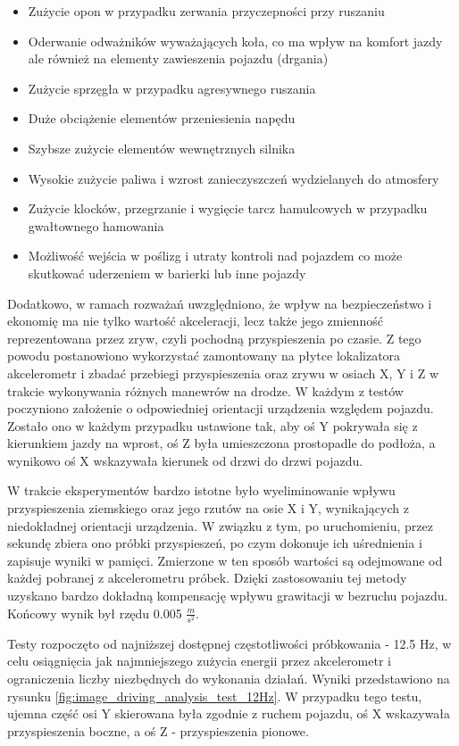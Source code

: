 \begin{itemize}
\item Zużycie opon w przypadku zerwania przyczepności przy ruszaniu
\item Oderwanie odważników wyważających koła, co ma wpływ na komfort jazdy ale również na elementy zawieszenia pojazdu (drgania)
\item Zużycie sprzęgła w przypadku agresywnego ruszania
\item Duże obciążenie elementów przeniesienia napędu
\item Szybsze zużycie elementów wewnętrznych silnika
\item Wysokie zużycie paliwa i wzrost zanieczyszczeń wydzielanych do atmosfery
\item Zużycie klocków, przegrzanie i wygięcie tarcz hamulcowych w przypadku gwałtownego hamowania
\item Możliwość wejścia w poślizg i utraty kontroli nad pojazdem co może skutkować uderzeniem w barierki lub inne pojazdy
\end{itemize}

Dodatkowo, w ramach rozważań uwzględniono, że wpływ na bezpieczeństwo i ekonomię ma nie tylko wartość akceleracji, lecz także jego zmienność reprezentowana przez zryw, czyli pochodną przyspieszenia po czasie. Z tego powodu postanowiono wykorzystać zamontowany na płytce lokalizatora akcelerometr i zbadać przebiegi przyspieszenia oraz zrywu w osiach X, Y i Z w trakcie wykonywania różnych manewrów na drodze. W każdym z testów poczyniono założenie o odpowiedniej orientacji urządzenia względem pojazdu. Zostało ono w każdym przypadku ustawione tak, aby oś Y pokrywała się z kierunkiem jazdy na wprost, oś Z była umieszczona prostopadle do podłoża, a wynikowo oś X wskazywała kierunek od drzwi do drzwi pojazdu.

W trakcie eksperymentów bardzo istotne było wyeliminowanie wpływu przyspieszenia ziemskiego oraz jego rzutów na osie X i Y, wynikających z niedokładnej orientacji urządzenia. W związku z tym, po uruchomieniu, przez sekundę zbiera ono próbki przyspieszeń, po czym dokonuje ich uśrednienia i zapisuje wyniki w pamięci. Zmierzone w ten sposób wartości są odejmowane od każdej pobranej z akcelerometru próbek. Dzięki zastosowaniu tej metody uzyskano bardzo dokładną kompensację wpływu grawitacji w bezruchu pojazdu. Końcowy wynik był rzędu 0.005 $\frac{m}{s^2}$.

Testy rozpoczęto od najniższej dostępnej częstotliwości próbkowania - 12.5 Hz, w celu osiągnięcia jak najmniejszego zużycia energii przez akcelerometr i ograniczenia liczby niezbędnych do wykonania działań. Wyniki przedstawiono na rysunku \ref{fig:image_driving_analysis_test_12Hz}. W przypadku tego testu, ujemna część osi Y skierowana była zgodnie z ruchem pojazdu, oś X wskazywała przyspieszenia boczne, a oś Z - przyspieszenia pionowe.

